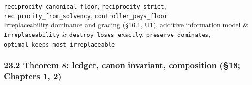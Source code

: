 \documentclass[
]{article}
\begin{document}
{\begin{longtable}[]
\texttt{r\allowbreak{}e\allowbreak{}c\allowbreak{}i\allowbreak{}p\allowbreak{}r\allowbreak{}o\allowbreak{}c\allowbreak{}i\allowbreak{}t\allowbreak{}y\allowbreak{}\_\allowbreak{}c\allowbreak{}a\allowbreak{}n\allowbreak{}o\allowbreak{}n\allowbreak{}i\allowbreak{}c\allowbreak{}a\allowbreak{}l\allowbreak{}\_\allowbreak{}f\allowbreak{}l\allowbreak{}o\allowbreak{}o\allowbreak{}r},
\texttt{r\allowbreak{}e\allowbreak{}c\allowbreak{}i\allowbreak{}p\allowbreak{}r\allowbreak{}o\allowbreak{}c\allowbreak{}i\allowbreak{}t\allowbreak{}y\allowbreak{}\_\allowbreak{}s\allowbreak{}t\allowbreak{}r\allowbreak{}i\allowbreak{}c\allowbreak{}t},
\texttt{r\allowbreak{}e\allowbreak{}c\allowbreak{}i\allowbreak{}p\allowbreak{}r\allowbreak{}o\allowbreak{}c\allowbreak{}i\allowbreak{}t\allowbreak{}y\allowbreak{}\_\allowbreak{}f\allowbreak{}r\allowbreak{}o\allowbreak{}m\allowbreak{}\_\allowbreak{}s\allowbreak{}o\allowbreak{}l\allowbreak{}v\allowbreak{}e\allowbreak{}n\allowbreak{}c\allowbreak{}y},
\texttt{c\allowbreak{}o\allowbreak{}n\allowbreak{}t\allowbreak{}r\allowbreak{}o\allowbreak{}l\allowbreak{}l\allowbreak{}e\allowbreak{}r\allowbreak{}\_\allowbreak{}p\allowbreak{}a\allowbreak{}y\allowbreak{}s\allowbreak{}\_\allowbreak{}f\allowbreak{}l\allowbreak{}o\allowbreak{}o\allowbreak{}r} \\
Irreplaceability dominance and grading (§16.1, U1), additive information
model & \texttt{Irreplaceability} &
\texttt{d\allowbreak{}e\allowbreak{}s\allowbreak{}t\allowbreak{}r\allowbreak{}o\allowbreak{}y\allowbreak{}\_\allowbreak{}l\allowbreak{}o\allowbreak{}s\allowbreak{}e\allowbreak{}s\allowbreak{}\_\allowbreak{}e\allowbreak{}x\allowbreak{}a\allowbreak{}c\allowbreak{}t\allowbreak{}l\allowbreak{}y},
\texttt{p\allowbreak{}r\allowbreak{}e\allowbreak{}s\allowbreak{}e\allowbreak{}r\allowbreak{}v\allowbreak{}e\allowbreak{}\_\allowbreak{}d\allowbreak{}o\allowbreak{}m\allowbreak{}i\allowbreak{}n\allowbreak{}a\allowbreak{}t\allowbreak{}e\allowbreak{}s},
\texttt{o\allowbreak{}p\allowbreak{}t\allowbreak{}i\allowbreak{}m\allowbreak{}a\allowbreak{}l\allowbreak{}\_\allowbreak{}k\allowbreak{}e\allowbreak{}e\allowbreak{}p\allowbreak{}s\allowbreak{}\_\allowbreak{}m\allowbreak{}o\allowbreak{}s\allowbreak{}t\allowbreak{}\_\allowbreak{}i\allowbreak{}r\allowbreak{}r\allowbreak{}e\allowbreak{}p\allowbreak{}l\allowbreak{}a\allowbreak{}c\allowbreak{}e\allowbreak{}a\allowbreak{}b\allowbreak{}l\allowbreak{}e} \\
\end{longtable}
}

\subsubsection{23.2 Theorem 8: ledger, canon invariant, composition
(§18; Chapters 1,
2)}\label{theorem-8-ledger-canon-invariant-composition-18-chapters-1-2}
\end{document}
